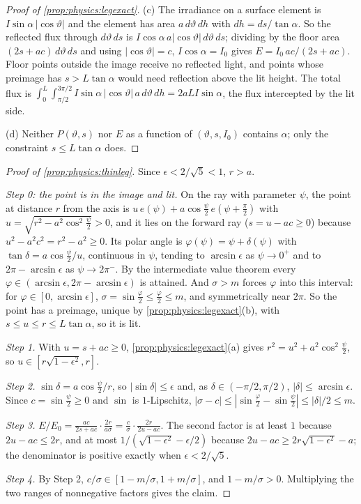 \begin{proof}[Proof of \cref{prop:physics:legexact}]
(c) The irradiance on a surface element is $I\sin\alpha\,|\cos\vartheta|$ and the element has
area $a\,d\vartheta\,dh$ with $dh=ds/\tan\alpha$. So the reflected flux through
$d\vartheta\,ds$ is $I\cos\alpha\,a|\cos\vartheta|\,d\vartheta\,ds$; dividing by the floor area
$(2s+ac)\,d\vartheta\,ds$ and using $|\cos\vartheta|=c$, $I\cos\alpha=I_0$ gives
$E=I_0\,ac/(2s+ac)$. Floor points outside the image receive no reflected light, and points
whose preimage has $s>L\tan\alpha$ would need reflection above the lit height. The total flux
is $\int_0^L\!\!\int_{\pi/2}^{3\pi/2}I\sin\alpha\,|\cos\vartheta|\,a\,d\vartheta\,dh=2aLI\sin\alpha$,
the flux intercepted by the lit side.

(d) Neither $P(\vartheta,s)$ nor $E$ as a function of $(\vartheta,s,I_0)$ contains $\alpha$; only
the constraint $s\le L\tan\alpha$ does.
\end{proof}

\begin{proof}[Proof of \cref{prop:physics:thinleg}]
Since $\epsilon<2/\sqrt5<1$, $r>a$.

\emph{Step 0: the point is in the image and lit.} On the ray with parameter $\psi$, the point at
distance $r$ from the axis is $u\,e(\psi)+a\cos\frac\psi2\,e(\psi+\frac\pi2)$ with
$u=\sqrt{r^2-a^2\cos^2\frac\psi2}>0$, and it lies on the forward ray ($s=u-ac\ge0$) because
$u^2-a^2c^2=r^2-a^2\ge0$. Its polar angle is $\varphi(\psi)=\psi+\delta(\psi)$ with
$\tan\delta=a\cos\frac\psi2/u$, continuous in $\psi$, tending to $\arcsin\epsilon$ as
$\psi\to0^+$ and to $2\pi-\arcsin\epsilon$ as $\psi\to2\pi^-$. By the intermediate value
theorem every $\varphi\in(\arcsin\epsilon,2\pi-\arcsin\epsilon)$ is attained. And $\sigma>m$
forces $\varphi$ into this interval: for $\varphi\in[0,\arcsin\epsilon]$,
$\sigma=\sin\frac\varphi2\le\frac\varphi2\le m$, and symmetrically near $2\pi$. So the point
has a preimage, unique by \cref{prop:physics:legexact}(b), with $s\le u\le r\le L\tan\alpha$,
so it is lit.

\emph{Step 1.} With $u=s+ac\ge0$, \cref{prop:physics:legexact}(a) gives
$r^2=u^2+a^2\cos^2\frac\psi2$, so $u\in[r\sqrt{1-\epsilon^2},r]$.

\emph{Step 2.} $\sin\delta=a\cos\frac\psi2/r$, so $|\sin\delta|\le\epsilon$ and, as
$\delta\in(-\pi/2,\pi/2)$, $|\delta|\le\arcsin\epsilon$. Since $c=\sin\frac\psi2\ge0$ and
$\sin$ is $1$-Lipschitz, $|\sigma-c|\le|\sin\frac\varphi2-\sin\frac\psi2|\le|\delta|/2\le m$.

\emph{Step 3.} $E/E_0=\frac{ac}{2s+ac}\cdot\frac{2r}{a\sigma}=\frac c\sigma\cdot\frac{2r}{2u-ac}$.
The second factor is at least $1$ because $2u-ac\le2r$, and at most
$1/(\sqrt{1-\epsilon^2}-\epsilon/2)$ because $2u-ac\ge2r\sqrt{1-\epsilon^2}-a$; the denominator
is positive exactly when $\epsilon<2/\sqrt5$.

\emph{Step 4.} By Step 2, $c/\sigma\in[1-m/\sigma,1+m/\sigma]$, and $1-m/\sigma>0$. Multiplying the
two ranges of nonnegative factors gives the claim.
\end{proof}

